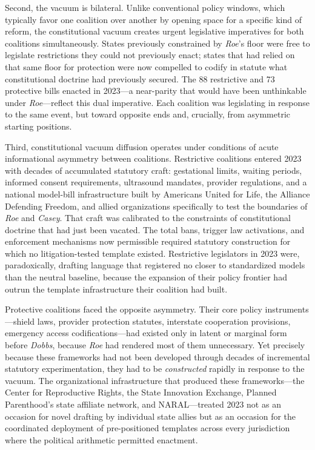 Second, the vacuum is bilateral. Unlike conventional policy windows, which typically favor one coalition over another by opening space for a specific kind of reform, the constitutional vacuum creates urgent legislative imperatives for both coalitions simultaneously. States previously constrained by \textit{Roe}'s floor were free to legislate restrictions they could not previously enact; states that had relied on that same floor for protection were now compelled to codify in statute what constitutional doctrine had previously secured. The 88 restrictive and 73 protective bills enacted in 2023---a near-parity that would have been unthinkable under \textit{Roe}---reflect this dual imperative. Each coalition was legislating in response to the same event, but toward opposite ends and, crucially, from asymmetric starting positions.

Third, constitutional vacuum diffusion operates under conditions of acute informational asymmetry between coalitions. Restrictive coalitions entered 2023 with decades of accumulated statutory craft: gestational limits, waiting periods, informed consent requirements, ultrasound mandates, provider regulations, and a national model-bill infrastructure built by Americans United for Life, the Alliance Defending Freedom, and allied organizations specifically to test the boundaries of \textit{Roe} and \textit{Casey}. That craft was calibrated to the constraints of constitutional doctrine that had just been vacated. The total bans, trigger law activations, and enforcement mechanisms now permissible required statutory construction for which no litigation-tested template existed. Restrictive legislators in 2023 were, paradoxically, drafting language that registered no closer to standardized models than the neutral baseline, because the expansion of their policy frontier had outrun the template infrastructure their coalition had built.

Protective coalitions faced the opposite asymmetry. Their core policy instruments---shield laws, provider protection statutes, interstate cooperation provisions, emergency access codifications---had existed only in latent or marginal form before \textit{Dobbs}, because \textit{Roe} had rendered most of them unnecessary. Yet precisely because these frameworks had not been developed through decades of incremental statutory experimentation, they had to be \emph{constructed} rapidly in response to the vacuum. The organizational infrastructure that produced these frameworks---the Center for Reproductive Rights, the State Innovation Exchange, Planned Parenthood's state affiliate network, and NARAL---treated 2023 not as an occasion for novel drafting by individual state allies but as an occasion for the coordinated deployment of pre-positioned templates across every jurisdiction where the political arithmetic permitted enactment.

